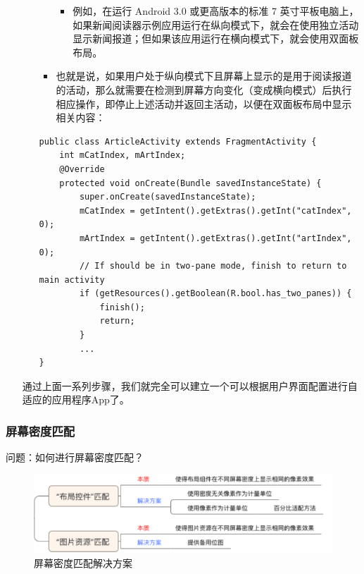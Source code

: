 \documentclass[9pt, b5paper]{article}
\begin{document}
\begin{enumerate}
\begin{itemize}
\begin{itemize}
\begin{itemize}
\item 例如，在运行 Android 3.0 或更高版本的标准 7 英寸平板电脑上，如果新闻阅读器示例应用运行在纵向模式下，就会在使用独立活动显示新闻报道；但如果该应用运行在横向模式下，就会使用双面板布局。
\end{itemize}
\item 也就是说，如果用户处于纵向模式下且屏幕上显示的是用于阅读报道的活动，那么就需要在检测到屏幕方向变化（变成横向模式）后执行相应操作，即停止上述活动并返回主活动，以便在双面板布局中显示相关内容：
\end{itemize}
\begin{verbatim}
public class ArticleActivity extends FragmentActivity {
    int mCatIndex, mArtIndex;
    @Override
    protected void onCreate(Bundle savedInstanceState) {
        super.onCreate(savedInstanceState);
        mCatIndex = getIntent().getExtras().getInt("catIndex", 0);
        mArtIndex = getIntent().getExtras().getInt("artIndex", 0);
        // If should be in two-pane mode, finish to return to main activity
        if (getResources().getBoolean(R.bool.has_two_panes)) {
            finish();
            return;
        }
        ...
}
\end{verbatim}
\end{itemize}

通过上面一系列步骤，我们就完全可以建立一个可以根据用户界面配置进行自适应的应用程序App了。
\end{enumerate}

\subsubsection{屏幕密度匹配}
\label{sec-6-6-2}

问题：如何进行屏幕密度匹配？

\begin{figure}[htb]
\centering
\includegraphics[width=.9\linewidth]{./pic/density.png}
\caption{屏幕密度匹配解决方案}
\end{figure}
\end{document}
